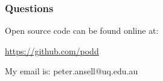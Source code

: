 \documentclass[12pt]{beamer}
\begin{document}
\begin{frame}
\frametitle{Questions}

\begin{center}
Open source code can be found online at:

\url{https://github.com/podd}

\vskip 12pt

My email is: peter.ansell@uq.edu.au
\end{center}
\end{frame}
\end{document}
